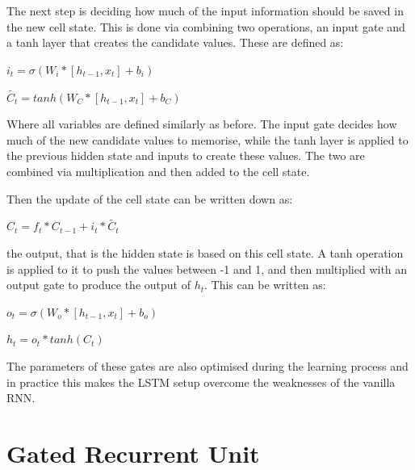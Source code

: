 \documentclass[bsc,frontabs,singlespacing,parskip,deptreport]{infthesis}
\begin{document}
The next step is deciding how much of the input information should be saved in the new cell state. This is done via combining two operations, an input gate and a tanh layer that creates the candidate values. These are defined as:

\begin{center}
$ i_t = \sigma(W_i*[h_{t-1}, x_t] + b_i) $
\end{center}

\begin{center}
$ \tilde{C_t} = tanh(W_C*[h_{t-1},x_t] + b_C) $
\end{center}

Where all variables are defined similarly as before. The input gate decides how much of the new candidate values to memorise, while the tanh layer is applied to the previous hidden state and inputs to create these values. The two are combined via multiplication and then added to the cell state.

Then the update of the cell state can be written down as:

\begin{center}
$ C_t = f_t*C_{t-1}+i_t*\tilde{C_t} $
\end{center}

the output, that is the hidden state is based on this cell state. A tanh operation is applied to it to push the values between -1 and 1, and then multiplied with an output gate to produce the output of $ h_t $. This can be written as:

\begin{center}
$ o_t = \sigma(W_o*[h_{t-1},x_t] + b_o) $
\end{center}

\begin{center}
$ h_t = o_t*tanh(C_t) $
\end{center}

The parameters of these gates are also optimised during the learning process and in practice this makes the LSTM setup overcome the weaknesses of the vanilla RNN.

\section{Gated Recurrent Unit}
\end{document}
